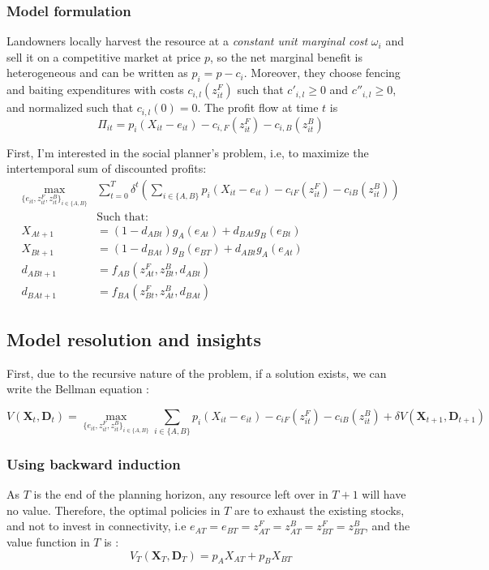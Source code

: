 \documentclass{article}
\begin{document}
\subsubsection{Model formulation}
Landowners locally harvest the resource at a \textit{constant unit marginal cost} $\omega_i$ and sell it on a competitive market at price $p$, so the net marginal benefit is heterogeneous and can be written as $p_i = p - c_i$. Moreover, they choose fencing and baiting expenditures with costs $c_{i,l}(z_{it}^F)$ such that $c'_{i,l}\geq 0$ and $c''_{i,l} \geq 0$, and normalized such that $c_{i,l}(0) = 0$. The profit flow at time $t$ is
\begin{equation}
    \Pi_{it} = p_i(X_{it} - e_{it}) - c_{i,F}(z_{it}^F) - c_{i,B}(z_{it}^B)
\end{equation}

First, I'm interested in the social planner's problem, i.e, to maximize the intertemporal sum of discounted profits:
\begin{align*}
    \max_{\{e_{it}, z_{it}^F, z_{it}^B \}_{i \in \{A,B\}}} & \sum_{t=0}^T \delta^t \left( \sum_{i \in \{A,B\}} p_i(X_{it} - e_{it}) - c_{iF}(z_{it}^F) - c_{iB}(z_{it}^B) \right)\\
     &\text{Such that:}\\
        X_{At+1} &= (1-d_{ABt})g_A(e_{At})+d_{BAt}g_B(e_{Bt})
    \\
    X_{Bt+1} &= (1 - d_{BAt})g_B(e_{BT}) + d_{ABt}g_A(e_{At})\\
     d_{ABt+1} &= f_{AB}(z^F_{At}, z^B_{Bt}, d_{ABt}) \\
    d_{BAt+1} &= f_{BA}(z^F_{Bt}, z^B_{At}, d_{BAt})
\end{align*}
\subsection{Model resolution and insights}
First, due to the recursive nature of the problem, if a solution exists, we can write the Bellman equation : 

\begin{equation}
    V(\mathbf{X}_t, \mathbf{D}_t) = \max_{\{e_{it}, z_{it}^F, z_{it}^B\}_{i \in \{A,B\}}} \sum_{i \in \{A,B\}} p_i(X_{it} - e_{it}) - c_{iF}(z_{it}^F) - c_{iB}(z_{it}^B) + \delta V(\mathbf{X}_{t+1}, \mathbf{D}_{t+1})
\end{equation}
\subsubsection{Using backward induction}
As $T$ is the end of the planning horizon, any resource left over in $T+1$ will have no value. Therefore, the optimal policies in $T$ are to exhaust the existing stocks, and not to invest in connectivity, i.e $e_{AT}=e_{BT}=z_{AT}^F = z_{AT}^B = z_{BT}^F = z_{BT}^B$, and the value function in $T$ is :
$$
V_T(\mathbf{X}_T, \mathbf{D}_T) = p_A X_{AT} + p_B X_{BT}
$$
\end{document}
